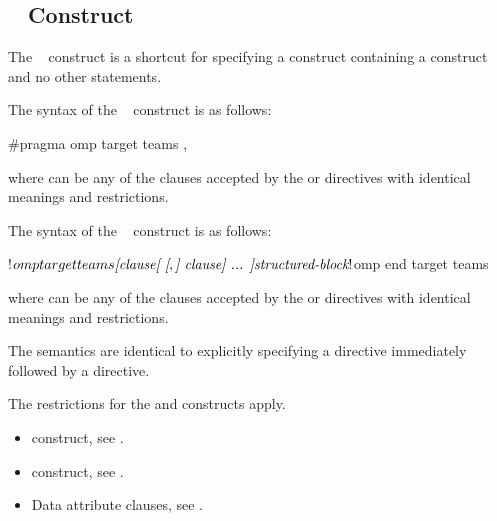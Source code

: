 \subsection{~ Construct}
\label{subsec:target teams Construct}
\summary
The ~ construct is a shortcut for specifying a  construct
containing a  construct and no other statements.

\syntax
\begin{ccppspecific}
The syntax of the ~ construct is as follows:

\begin{ompcPragma}
#pragma omp target teams \plc{[clause[ [},\plc{] clause] ... ] new-line}
\end{ompcPragma}

where  can be any of the clauses accepted by the  or  directives
with identical meanings and restrictions.
\end{ccppspecific}

\begin{fortranspecific}
The syntax of the ~ construct is as follows:

\begin{ompfPragma}
!$omp target teams \plc{[clause[ [},\plc{] clause] ... ]}
    \plc{structured-block}
!$omp end target teams
\end{ompfPragma}

where  can be any of the clauses accepted by the  or  directives
with identical meanings and restrictions.
\end{fortranspecific}

\descr

The semantics are identical to explicitly specifying a  directive
immediately followed by a  directive.

\restrictions
The restrictions for the  and  constructs apply.

\crossreferences
\begin{itemize}
\item {} construct, see .

\item {} construct, see .

\item Data attribute clauses, see
.
\end{itemize}









